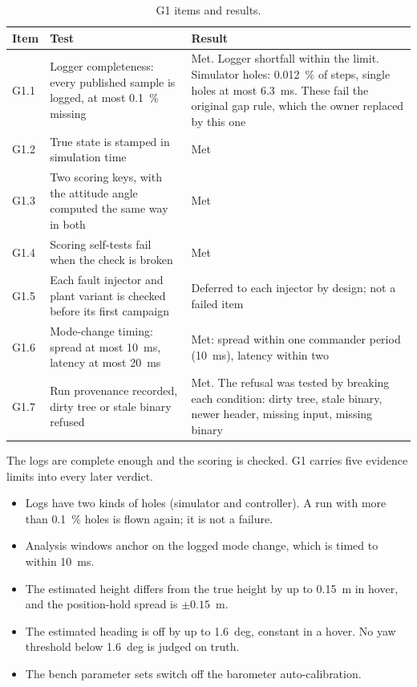 \begin{table}[tbp]
\caption{G1 items and results.}\label{tab:val_g1}
\centering
\small
\begin{tabularx}{\textwidth}{@{}l L{4.9cm} Y@{}}
\toprule
Item & Test & Result \\
\midrule
G1.1 & Logger completeness: every published sample is logged, at most 0.1~\% missing & Met. Logger shortfall within the limit. Simulator holes: 0.012~\% of steps, single holes at most 6.3~ms. These fail the original gap rule, which the owner replaced by this one \\
G1.2 & True state is stamped in simulation time & Met \\
G1.3 & Two scoring keys, with the attitude angle computed the same way in both & Met \\
G1.4 & Scoring self-tests fail when the check is broken & Met \\
G1.5 & Each fault injector and plant variant is checked before its first campaign & Deferred to each injector by design; not a failed item \\
G1.6 & Mode-change timing: spread at most 10~ms, latency at most 20~ms & Met: spread within one commander period (10~ms), latency within two \\
G1.7 & Run provenance recorded, dirty tree or stale binary refused & Met. The refusal was tested by breaking each condition: dirty tree, stale binary, newer header, missing input, missing binary \\
\bottomrule
\end{tabularx}
\end{table}

\begin{keyresult}
The logs are complete enough and the scoring is checked.
G1 carries five evidence limits into every later verdict.
\begin{itemize}
  \item Logs have two kinds of holes (simulator and controller). A run with more than 0.1~\% holes is flown again; it is not a failure.
  \item Analysis windows anchor on the logged mode change, which is timed to within 10~ms.
  \item The estimated height differs from the true height by up to 0.15~m in hover, and the position-hold spread is $\pm 0.15$~m.
  \item The estimated heading is off by up to 1.6~deg, constant in a hover. No yaw threshold below 1.6~deg is judged on truth.
  \item The bench parameter sets switch off the barometer auto-calibration.
\end{itemize}
\end{keyresult}

